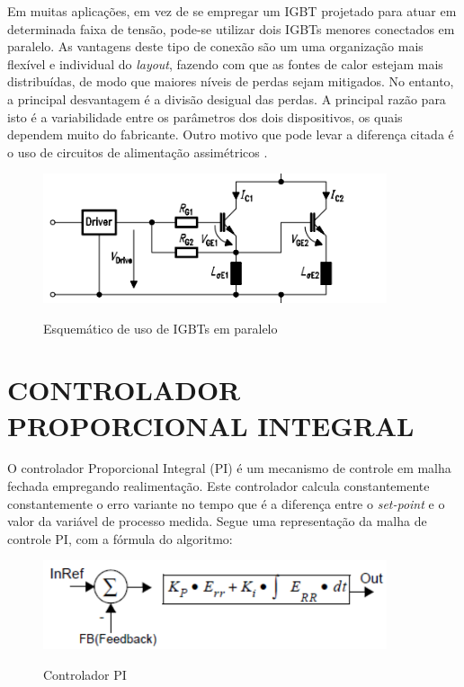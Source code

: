 Em muitas aplicações, em vez de se empregar um IGBT projetado para atuar em determinada faixa de tensão, pode-se utilizar dois IGBTs menores conectados em paralelo. As vantagens deste tipo de conexão são um uma organização mais flexível e individual do \textit{layout}, fazendo com que as fontes de calor estejam mais distribuídas, de modo que maiores níveis de perdas sejam mitigados. No entanto, a principal desvantagem é a divisão desigual das perdas. A principal razão para isto é a variabilidade entre os parâmetros dos dois dispositivos, os quais dependem muito do fabricante. Outro motivo que pode levar a diferença citada é o uso de circuitos de alimentação assimétricos \cite{Infineon}.
            
\begin{figure}[!htb]
    \centering
    \caption{Esquemático de uso de IGBTs em paralelo}
    \includegraphics[width=0.9\textwidth]{./dados/figuras/paralleligbt}
    \label{fig:figura-paralleligbt}
\end{figure}

\section{CONTROLADOR PROPORCIONAL INTEGRAL}
\label{sec:pi-controller}
O controlador Proporcional Integral (PI) é um mecanismo de controle em malha fechada empregando realimentação. Este controlador calcula constantemente constantemente o erro variante no tempo que é a diferença entre o \textit{set-point} e o valor da variável de processo medida. Segue uma representação da malha de controle PI, com a fórmula do algoritmo:

\begin{figure}[H]
    \centering
    \caption{Controlador PI}
    \includegraphics[width=0.9\textwidth]{./dados/figuras/pi-controller}
    \label{fig:figura-pi-controller}
\end{figure}

